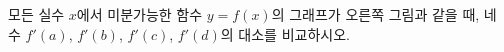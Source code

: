 \noindent\begin{minipage}[t]{0.58\linewidth}\vspace{0pt}\raggedright 모든 실수 $x$에서 미분가능한 함수 $y=f(x)$의 그래프가 오른쪽 그림과 같을 때, 네 수 $f'(a)$, $f'(b)$, $f'(c)$, $f'(d)$의 대소를 비교하시오.\end{minipage}\hfill\begin{minipage}[t]{0.4\linewidth}\vspace{0pt}\centering \resizebox{\ifdim\width>\linewidth\linewidth\else\width\fi}{!}{}\end{minipage}\par
